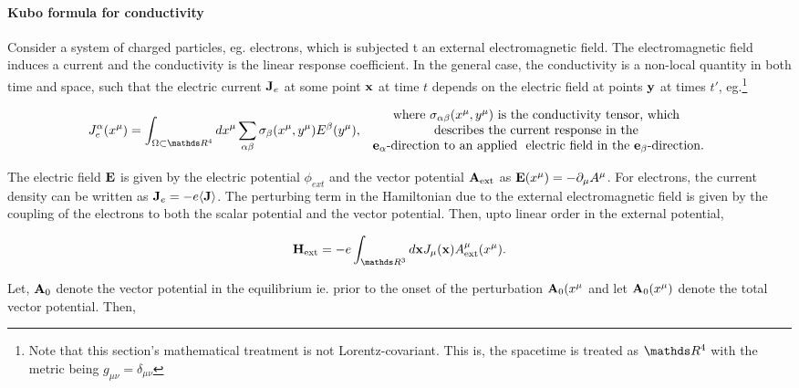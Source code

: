 \documentclass{homework}
\begin{document}
\paragraph{\textbf{Kubo formula for conductivity}}

Consider a system of charged particles, eg. electrons, which is subjected t an external electromagnetic field. The electromagnetic field induces a current and the conductivity is the linear response coefficient. In the general case, the conductivity is a non-local quantity in both time and space, such that the electric current ${{\bf J}_e}$ at some point ${\bf x}$ at time $t$ depends on the electric field at points ${\bf y}$ at times $t'$, eg.\footnote{Note that this section's mathematical treatment is not Lorentz-covariant. This is, the spacetime is treated as $\R^4$ with the metric being $g_{\mu \nu} = \delta_{\mu \nu}$} 

\begin{equation}
    J^{\alpha}_{e}(x^\mu) = \int_{\Omega \subset \R^4 } dx^{\mu} \sum_{\alpha \beta} \sigma_{\beta}(x^\mu, y^{\mu}) E^{\beta} (y^{\mu}), \begin{array}{c} 
         \textnormal{ where $\sigma_{\alpha \beta}(x^\mu, y^{\mu})$ is the conductivity tensor, which  } \\ 
         \textnormal{ describes the current response in the } \\
         \textnormal{ ${\bf e}_\alpha$-direction to an applied }
         \textnormal{ electric field in the ${\bf e}_\beta$-direction.}
    \end{array}
\end{equation}

The electric field ${\bf E}$ is given by the electric potential $\phi_{ext}$ and the vector potential ${\bf A}_{\textnormal{ext}}$ as $
{\bf E}(x^\mu) = -\partial_{\mu} A^{\mu}$. For electrons, the current density can be written as ${\bf J}_e = -e \langle {\bf J} \rangle$. The perturbing term in the Hamiltonian due to the external electromagnetic field is given by the coupling of the electrons to both the scalar potential and the vector potential. Then, upto linear order in the external potential, 

$$
\Hamiltonian_{\textnormal{ext}} = -e \int_{\R^3} d{\bf x} J_{\mu}({\bf x}) A^{\mu}_{\textnormal{ext}}(x^{\mu}).
$$

Let, ${\bf A}_0$ denote the vector potential in the equilibrium ie. prior to the onset of the perturbation ${\bf A}_0(x^{\mu}$ and let ${\bf A}_0(x^{\mu})$ denote the total vector potential. Then, 
\end{document}
